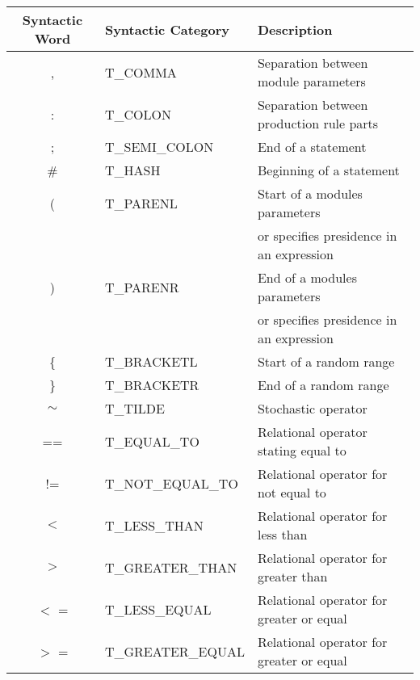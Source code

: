 \begin{table}[h!] \center
\begin{tabular}{  c | l | l }

	Syntactic Word	& Syntactic Category & Description\\  
\hline
\hline
	, 				& T\_COMMA 				& Separation between module parameters \\

	: 				& T\_COLON 				& Separation between production rule parts \\

	; 				& T\_SEMI\_COLON 		& End of a statement\\

	\#				& T\_HASH 				& Beginning of a statement\\

	( 				& T\_PARENL 			& Start of a modules parameters \\
					&						& or specifies presidence in an expression \\

	) 				& T\_PARENR 			& End of a modules parameters \\
					&						& or specifies presidence in an expression \\
 
	\{ 				& T\_BRACKETL 			& Start of a random range\\

	\} 				& T\_BRACKETR 			& End of a random range\\

	$\sim$ 			& T\_TILDE 				& Stochastic operator\\

	== 				& T\_EQUAL\_TO 			& Relational operator stating equal to\\

	!= 				& T\_NOT\_EQUAL\_TO 	& Relational operator for not equal to\\
	
	$<$ 			& T\_LESS\_THAN 		& Relational operator for less than\\

	$>$ 			& T\_GREATER\_THAN 		& Relational operator for greater than\\

	$<$ = 			& T\_LESS\_EQUAL 		& Relational operator for greater or equal\\

	$>$ = 			& T\_GREATER\_EQUAL 	& Relational operator for greater or equal\\


\end{tabular}
\end{table}
